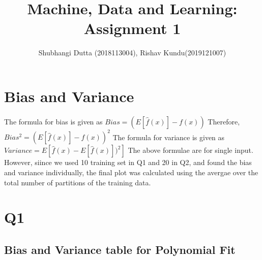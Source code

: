 \documentclass{article}
\begin{document}
\title{Machine, Data and Learning: Assignment 1}
\author{Shubhangi Dutta (2018113004), Rishav Kundu(2019121007)}
\maketitle
\newpage
\section{Bias and Variance}
The formula for bias is given as 
\newline
$Bias=(E[\hat{f}(x)]-f(x))$
\newline 
Therefore, 
\newline
$Bias^2=(E[\hat{f}(x)]-f(x))^2$
\newline
The formula for variance is given as 
\newline
$Variance=E[\hat{f}(x)-E[\hat{f}(x)])^2]$
\newline \newline
The above formulae are for single input. However, siince we used 10 training set in Q1 and 20 in Q2, and found the bias and variance individually, the final plot was calculated using the avergae over the total number of partitions of the training data.

\section{Q1}
\subsection{Bias and Variance table for Polynomial Fit}
\end{document}
